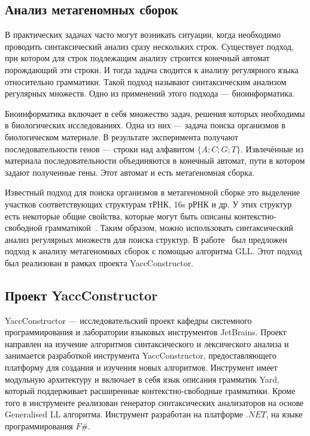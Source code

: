 \documentclass[14pt]{matmex-diploma-custom}
\begin{document}
	\subsection{Анализ метагеномных сборок}
	В практических задачах часто могут возникать ситуации, когда необходимо проводить синтаксический анализ 
    сразу нескольких строк. Существует подход, при котором для строк подлежащим анализу строится 
    конечный автомат порождающий эти строки. И тогда задача сводится к анализу регулярного языка относительно 
    грамматики. Такой подход называют синтаксическим анализом регулярных множеств. Одно из применений этого подхода ---
    биоинформатика.
    
    Биоинформатика включает в себя множество задач, решения которых необходимы в биологических исследованиях.
    Одна из них --- задача поиска организмов в биологическом материале.
    В результате эксперимента получают последовательности генов --- строки над алфавитом $\{A;C; G; T\}$.
    Извлечённые из материала последовательности объединяются в конечный автомат, пути в котором задают полученные 
    гены. Этот автомат и есть метагеномная сборка.
    
    Известный подход для поиска организмов в метагеномной сборке это выделение участков соответствующих структурам
    тРНК, 16s рРНК и др. У этих структур есть некоторые общие свойства, которые могут быть описаны
    контекстно-свободной грамматикой~\cite{Anderson2013}.
    Таким образом, можно использовать синтаксический анализ регулярных множеств для поиска структур.
	В работе~\cite{ragozina} был предложен подход к анализу метагеномных
	сборок с помощью алгоритма GLL. Этот подход был реализован в рамках проекта YaccConstructor.
	
    \subsection{Проект YaccConstructor}
    YaccConstructor --- исследовательский проект кафедры системного программирования и лаборатории
    языковых инструментов JetBrains. Проект направлен на изучение алгоритмов синтаксического и 
    лексического анализа и занимается разработкой инструмента YaccConstructor, предоставляющего платформу для
    создания и изучения новых алгоритмов. Инструмент имеет модульную архитектуру и включает в себя язык описания 
    грамматик Yard, который поддерживает расширенные контекстно-свободные грамматики. Кроме того в инструменте 
    реализован генератор синтаксических анализаторов на основе Generalised LL алгоритма.
    Инструмент разработан на платформе $.NET$, на языке программирования $F\#$.
    
\end{document}
